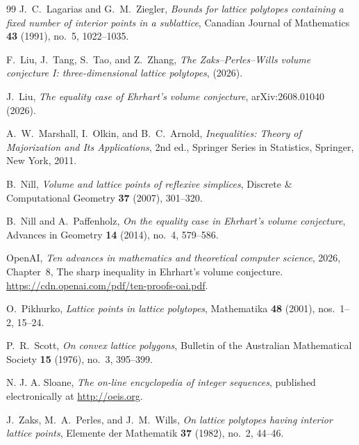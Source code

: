 \documentclass[reqno, 11pt]{article}
\numberwithin{equation}{section}
\theoremstyle{definition}
\begin{document}
\begin{thebibliography}{99}
 J.~C.~Lagarias and G.~M.~Ziegler, \emph{Bounds for lattice polytopes containing a fixed number of interior points in a sublattice}, Canadian Journal of Mathematics \textbf{43} (1991), no.~5, 1022--1035.

 F.~Liu, J.~Tang, S.~Tao, and Z.~Zhang, \emph{The Zaks--Perles--Wills volume conjecture I: three-dimensional lattice polytopes}, (2026).


 J.~Liu, \emph{The equality case of Ehrhart's volume conjecture}, arXiv:2608.01040 (2026).

 A.~W.~Marshall, I.~Olkin, and B.~C.~Arnold, \emph{Inequalities: Theory of Majorization and Its Applications}, 2nd ed., Springer Series in Statistics, Springer, New York, 2011.

 B.~Nill, \emph{Volume and lattice points of reflexive simplices}, Discrete \& Computational Geometry \textbf{37} (2007), 301--320.

 B.~Nill and A.~Paffenholz, \emph{On the equality case in Ehrhart's volume conjecture}, Advances in Geometry \textbf{14} (2014), no.~4, 579--586.

 OpenAI, \emph{Ten advances in mathematics and theoretical computer science}, 2026, Chapter~8, The sharp inequality in Ehrhart's volume conjecture. \url{https://cdn.openai.com/pdf/ten-proofs-oai.pdf}.

 O.~Pikhurko, \emph{Lattice points in lattice polytopes}, Mathematika \textbf{48} (2001), nos.~1--2, 15--24.

 P.~R.~Scott, \emph{On convex lattice polygons}, Bulletin of the Australian Mathematical Society \textbf{15} (1976), no.~3, 395--399.
    
 N. J. A. Sloane, \emph{The on-line encyclopedia of integer sequences}, published electronically at \url{http://oeis.org}.

 J.~Zaks, M.~A.~Perles, and J.~M.~Wills, \emph{On lattice polytopes having interior lattice points}, Elemente der Mathematik \textbf{37} (1982), no.~2, 44--46.

\end{thebibliography}
\end{document}
